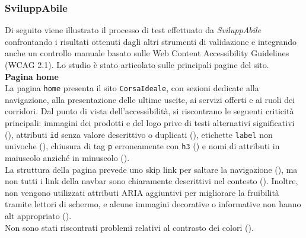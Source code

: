 \subsubsection{SviluppAbile}
\noindent Di seguito viene illustrato il processo di test effettuato da \textit{SviluppAbile} confrontando i risultati ottenuti dagli altri strumenti di validazione e integrando anche un controllo manuale basato sulle Web Content Accessibility Guidelines (WCAG 2.1). Lo studio è stato articolato sulle principali pagine del sito.\\

\noindent \textbf{Pagina home}\\
La pagina \texttt{home} presenta il sito \texttt{CorsaIdeale}, con sezioni dedicate alla navigazione, alla presentazione delle ultime uscite, ai servizi offerti e ai ruoli dei corridori. Dal punto di vista dell’accessibilità, si riscontrano le seguenti criticità principali: immagini dei prodotti e del logo prive di testi alternativi significativi ({}), attributi \texttt{id} senza valore descrittivo o duplicati ({}), etichette \texttt{label} non univoche ({}), chiusura di tag \texttt{p} erroneamente con \texttt{h3} ({}) e nomi di attributi in maiuscolo anziché in minuscolo ({}).\\
La struttura della pagina prevede uno skip link per saltare la navigazione ({}), ma non tutti i link della navbar sono chiaramente descrittivi nel contesto ({}). Inoltre, non vengono utilizzati attributi ARIA aggiuntivi per migliorare la fruibilità tramite lettori di schermo, e alcune immagini decorative o informative non hanno alt appropriato ({}).\\
Non sono stati riscontrati problemi relativi al contrasto dei colori ({}).\\

